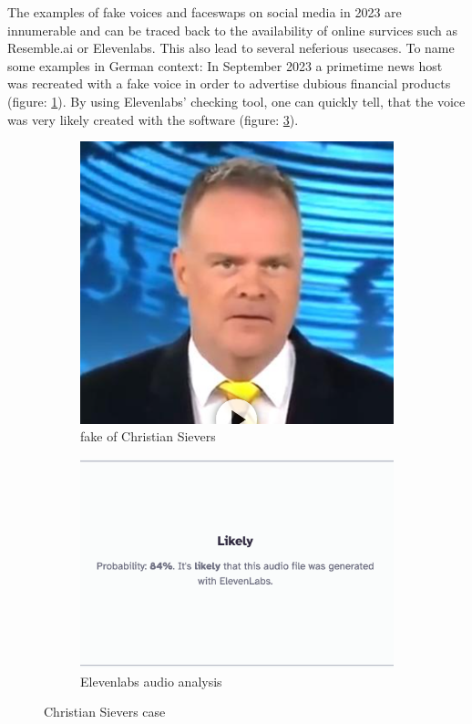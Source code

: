 \documentclass[
  a4paper,  %
  twoside,  %
  bibliography=totoc,
  headsepline,
  cleardoublepage=empty,
  parskip=half,
  draft=false
]{scrbook}
\begin{document}
The examples of fake voices and faceswaps on social media in 2023 are innumerable and can be traced back to the availability of online survices such as Resemble.ai or Elevenlabs. This also lead to several neferious usecases. To name some examples in German context: In September 2023 a primetime news host was recreated with a fake voice in order to advertise dubious financial products (figure: \ref{fig:sievers-fake}). By using Elevenlabs' checking tool, one can quickly tell, that the voice was very likely created with the software (figure: \ref{fig:sievers-11labs}). 
\begin{figure}[h]
  \centering
  \begin{subfigure}[b]{0.45\textwidth}
    \includegraphics[width=\textwidth]{./graphics/images/sievers.png}
    \caption{fake of Christian Sievers \cite{zdfDeepfakeMitZDFModerator}}
    \label{fig:sievers-fake}
  \end{subfigure}
  \hfill
  \begin{subfigure}[b]{0.45\textwidth}
    \includegraphics[width=\textwidth]{./graphics/images/sievers-11labs.png}
    \caption{Elevenlabs audio analysis \cite{elevenlabsAISpeechClassifier}}
    \label{fig:sievers-11labs}
  \end{subfigure}
  \caption{Christian Sievers case}
\end{figure}
\end{document}
